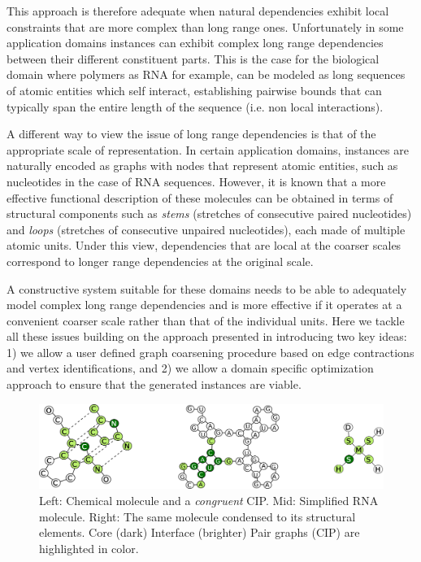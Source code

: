 \documentclass{article}
\begin{document}
This approach is therefore adequate when natural dependencies exhibit local
constraints that are more complex than long range ones.  Unfortunately in
some application domains instances can exhibit complex long range
dependencies between their different constituent parts. This is the case for
the biological domain where polymers as RNA for example, can be modeled as
long sequences of atomic entities which self interact, establishing pairwise
bounds that can typically span the entire length of the sequence (i.e. non
local interactions).

A different way to view the issue of long range dependencies is that of the
appropriate scale of representation. In certain application domains, instances
are naturally encoded as graphs with nodes that represent atomic entities,
such as nucleotides in the case of RNA sequences. However, it is known that a
more effective functional description of these molecules can be obtained in
terms of structural components such as {\em stems} (stretches of consecutive
paired nucleotides) and {\em loops} (stretches of consecutive unpaired
nucleotides), each made of multiple atomic units. Under this view,
dependencies that are local at the coarser scales correspond to longer range
dependencies at the original scale.

A constructive system suitable for these domains needs to be able to
adequately model complex long range dependencies and is more effective if it
operates at a convenient coarser scale rather than that of the individual
units. Here we tackle all these issues building on the approach presented in
\cite{costa16} introducing two key ideas: 1) we allow a user defined graph
coarsening procedure based on edge contractions and vertex identifications,
and 2) we allow a domain specific optimization approach to ensure that the
generated instances are viable.

%


\begin{figure}[ht]
      \centering
        \includegraphics[width=0.7\linewidth]{images/allcipsinone.png}
      \caption{Left: Chemical molecule and a \emph{congruent} CIP. 
               Mid: Simplified RNA molecule.  Right:  The same molecule
               condensed to its structural elements.
             Core (dark) Interface (brighter) Pair graphs (CIP) are highlighted in color.}
      \label{allcips}
\end{figure}
\end{document}
